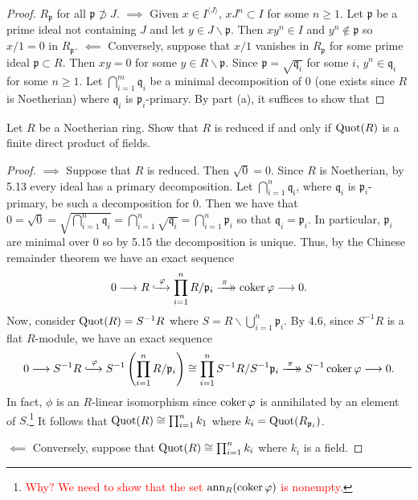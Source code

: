 \begin{proof}
$R_{\mathfrak{p}}$ for all $\mathfrak{p}\nsupset J$. $\implies$
Given $x\in I^{\langle J\rangle}$, $xJ^n\subset I$ for some
$n\geq 1$. Let $\mathfrak{p}$ be a prime ideal not containing $J$
and let $y\in J\smallsetminus\mathfrak{p}$. Then $xy^n\in I$ and
$y^n\notin\mathfrak{p}$ so $x/1=0$ in
$R_{\mathfrak{p}}$. $\impliedby$ Conversely, suppose that $x/1$
vanishes in $R_{\mathfrak{p}}$ for some prime ideal
$\mathfrak{p}\subset R$. Then $xy=0$ for some
$y\in R\smallsetminus\mathfrak{p}$. Since
$\mathfrak{p}=\sqrt{\mathfrak{q}_i}$ for some $i$,
$y^n\in\mathfrak{q}_i$ for some $n\geq 1$. Let
$\bigcap_{i=1}^m\mathfrak{q}_i$ be a minimal decomposition of $0$
(one exists since $R$ is Noetherian) where $\mathfrak{q}_i$ is
$\mathfrak{p}_i$-primary. By part (a), it suffices to show that
\end{proof}
\newpage
\begin{problem}
Let $R$ be a Noetherian ring. Show that $R$ is reduced if and
only if $\operatorname{Quot}(R)$ is a finite direct product of fields.
\end{problem}
\begin{proof}
$\implies$ Suppose that $R$ is reduced. Then $\sqrt{0}=0$. Since
$R$ is Noetherian, by 5.13 every ideal has a primary
decomposition. Let $\bigcap_{i=1}^n\mathfrak{q_i}$, where
$\mathfrak{q}_i$ is $\mathfrak{p}_i$-primary, be such a
decomposition for $0$. Then we have that
$0=\sqrt{0}=\sqrt{\bigcap_{i=1}^n\mathfrak{q}_i}=\bigcap_{i=1}^n\sqrt{\mathfrak{q}_i}=\bigcap_{i=1}^n\mathfrak{p}_i$
so that $\mathfrak{q}_i=\mathfrak{p}_i$. In particular,
$\mathfrak{p}_i$ are minimal over $0$ so by 5.15 the
decomposition is unique. Thus, by the Chinese remainder theorem
we have an exact sequence
\[
0
\longrightarrow
R
\xhookrightarrow{\;\phi\;}
\prod_{i=1}^n R/\mathfrak{p}_i
\xtwoheadrightarrow{\;\pi\;}
\coker\phi
\longrightarrow
0.
\]
Now, consider
$\operatorname{Quot}(R)=S^{-1}R$ where
$S=R\smallsetminus\bigcup_{i=1}^n\mathfrak{p}_i$. By 4.6, since
$S^{-1}R$ is a flat $R$-module, we have an exact sequence
\[
0
\longrightarrow
S^{-1}R
\xhookrightarrow{\;\phi\;}
S^{-1}\left(\prod_{i=1}^nR/\mathfrak{p}_i\right)
\cong
\prod_{i=1}^nS^{-1}R/S^{-1}\mathfrak{p}_i
\xtwoheadrightarrow{\;\pi\;}
S^{-1}\coker\phi
\longrightarrow
0
.
\]
In fact, $\phi$ is an $R$-linear isomorphism since $\operatorname{coker}\varphi$
is annihilated by an element of
$S$.\footnote{\textcolor{Red}{Why? We need to show that the set
$\operatorname{ann}_R(\operatorname{coker}\varphi)$ is nonempty.}}
It follows that $\operatorname{Quot}(R)\cong \prod_{i=1}^n k_1$ where
$k_i=\operatorname{Quot}(R_{\mathfrak{p}_i})$.

$\impliedby$ Conversely, suppose that $\operatorname{Quot}(R)\cong\prod_{i=1}^n
k_i$ where $k_i$ is a field.
\end{proof}
